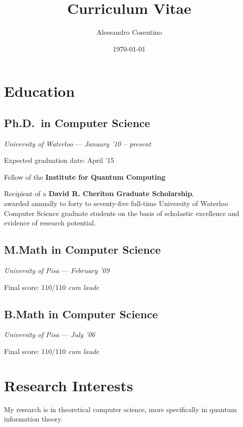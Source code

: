 \documentclass[]{article}
\title{Curriculum Vitae}
\author{Alessandro Cosentino}
\date{\today}
\begin{document}
\maketitle
\thispagestyle{empty}

\section{Education}\label{education}

\subsection{Ph.D.~in Computer Science}\label{ph.d.in-computer-science}

\emph{University of Waterloo} --- \emph{January '10 -- present}

Expected graduation date: April '15

Fellow of the \textbf{Institute for Quantum Computing}

Recipient of a \textbf{David R. Cheriton Graduate Scholarship},\\awarded
annually to forty to seventy-five full-time University of Waterloo
Computer Science graduate students on the basis of scholastic excellence
and evidence of research potential.

\subsection{M.Math in Computer
Science}\label{m.math-in-computer-science}

\emph{University of Pisa} --- \emph{February '09}

Final score: 110/110 \emph{cum laude}

\subsection{B.Math in Computer
Science}\label{b.math-in-computer-science}

\emph{University of Pisa} --- \emph{July '06}

Final score: 110/110 \emph{cum laude}

\section{Research Interests}

My research is in theoretical computer science, more specifically in quantum 
information theory.
\end{document}
